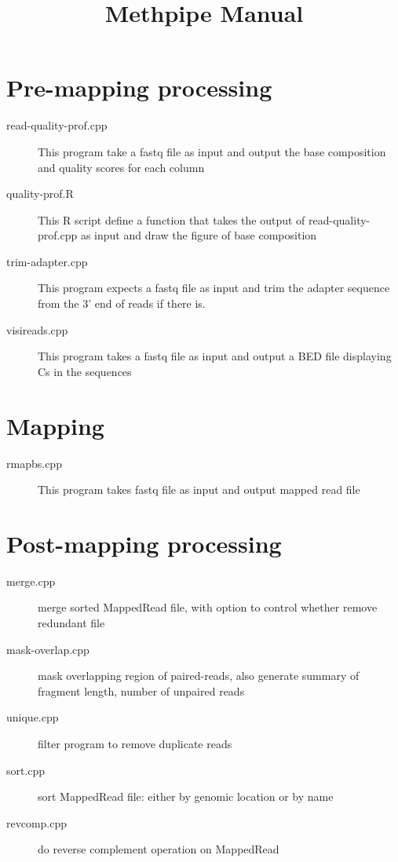\documentclass{article}
\title{Methpipe Manual}
\date{}
\begin{document}
\maketitle

\section{Pre-mapping processing}
\label{sec:premapping}
\begin{description}
\item[read-quality-prof.cpp]
This program take a fastq file as input and output the base composition and 
quality scores for each column
\item[quality-prof.R]
This R script define a function that takes the output of read-quality-prof.cpp as input 
and draw the figure of base composition
\item[trim-adapter.cpp] 
This program expects a fastq file as input and trim the adapter sequence from the 3' end
of reads if there is.
\item[visireads.cpp]
This program takes a fastq file as input and output a BED file displaying Cs in 
the sequences
\end{description}


\section{Mapping}
\label{sec:mapping}
\begin{description}
\item[rmapbs.cpp]
This program takes fastq file as input and output mapped read file
\end{description}

\section{Post-mapping processing}
\label{sec:postmapping}

\begin{description}
\item[merge.cpp]
merge sorted MappedRead file, with option to control whether remove redundant file

\item[mask-overlap.cpp]
mask overlapping region of paired-reads, also generate summary of fragment length,
number of unpaired reads

\item[unique.cpp ]
filter program to remove duplicate reads

\item[ sort.cpp ]
sort MappedRead file: either by genomic location or by name

\item[ revcomp.cpp ]
do reverse complement operation on MappedRead

\end{description}
\end{document}

